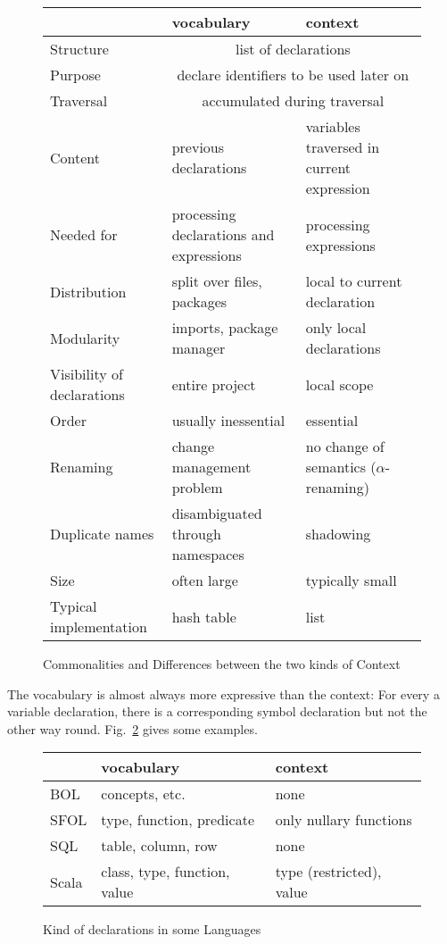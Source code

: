 \begin{figure}[hbt]
\begin{center}
\begin{tabular}{l|ll}
& vocabulary & context \\
\hline
Structure & \multicolumn{2}{c}{list of declarations} \\
Purpose & \multicolumn{2}{c}{declare identifiers to be used later on} \\
Traversal & \multicolumn{2}{c}{accumulated during traversal} \\
\hline
Content & previous declarations & variables traversed in current expression \\
Needed for & processing declarations and expressions & processing expressions \\
Distribution & split over files, packages & local to current declaration \\
Modularity & imports, package manager & only local declarations \\
Visibility of declarations & entire project & local scope \\
Order & usually inessential & essential \\
Renaming & change management problem & no change of semantics ($\alpha$-renaming) \\
Duplicate names & disambiguated through namespaces & shadowing \\
Size & often large & typically small \\
Typical implementation & hash table & list \\
\end{tabular}
\caption{Commonalities and Differences between the two kinds of Context}\label{fig:vocctx}
\end{center}
\end{figure}

The vocabulary is almost always more expressive than the context: For every a variable declaration, there is a corresponding symbol declaration but not the other way round.
Fig.~\ref{fig:declsex} gives some examples.

\begin{figure}[hbt]
\begin{center}
\begin{tabular}{l|ll}
& vocabulary & context \\
\hline
BOL & concepts, etc. & none \\
SFOL & type, function, predicate & only nullary functions \\
SQL & table, column, row & none \\
Scala & class, type, function, value & type (restricted), value \\
\end{tabular}
\caption{Kind of declarations in some Languages}\label{fig:declsex}
\end{center}
\end{figure}

